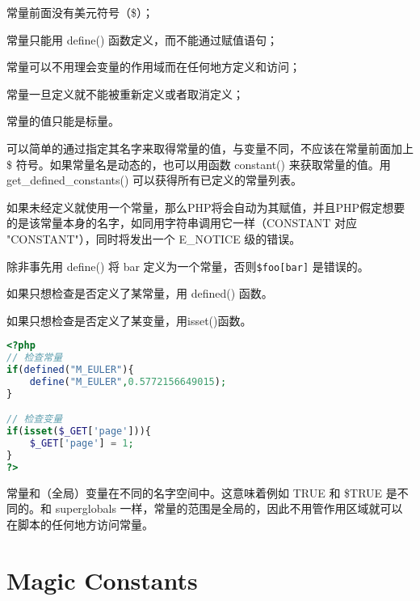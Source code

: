 \begin{compactitem}
\item 常量前面没有美元符号（\$）；
\item 常量只能用 define() 函数定义，而不能通过赋值语句；
\item 常量可以不用理会变量的作用域而在任何地方定义和访问；
\item 常量一旦定义就不能被重新定义或者取消定义；
\item 常量的值只能是标量。
\end{compactitem}


可以简单的通过指定其名字来取得常量的值，与变量不同，不应该在常量前面加上 \$ 符号。如果常量名是动态的，也可以用函数 constant() 来获取常量的值。用 get\_defined\_constants() 可以获得所有已定义的常量列表。

如果未经定义就使用一个常量，那么PHP将会自动为其赋值，并且PHP假定想要的是该常量本身的名字，如同用字符串调用它一样（CONSTANT 对应 "CONSTANT"），同时将发出一个 E\_NOTICE 级的错误。

除非事先用 define() 将 bar 定义为一个常量，否则\texttt{\$foo[bar]} 是错误的。

\begin{compactitem}
\item 如果只想检查是否定义了某常量，用 defined() 函数。
\item 如果只想检查是否定义了某变量，用isset()函数。
\end{compactitem}

\begin{lstlisting}[language=PHP]
<?php
// 检查常量
if(defined("M_EULER"){
	define("M_EULER",0.5772156649015);
}

// 检查变量
if(isset($_GET['page'])){
	$_GET['page'] = 1;
}
?>
\end{lstlisting}



常量和（全局）变量在不同的名字空间中。这意味着例如 TRUE 和 \$TRUE 是不同的。和 superglobals 一样，常量的范围是全局的，因此不用管作用区域就可以在脚本的任何地方访问常量。














\section{Magic Constants}


